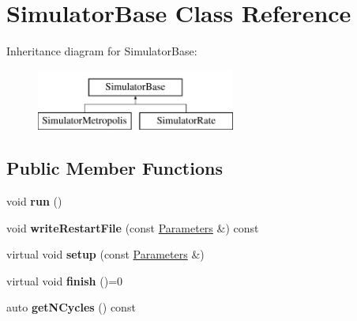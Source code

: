 \hypertarget{classSimulatorBase}{}\section{Simulator\+Base Class Reference}
\label{classSimulatorBase}
Inheritance diagram for Simulator\+Base\+:\begin{figure}[H]
\begin{center}
\leavevmode
\includegraphics[height=2.000000cm]{classSimulatorBase}
\end{center}
\end{figure}
\subsection*{Public Member Functions}
\begin{DoxyCompactItemize}
\item 
\mbox{\label{classSimulatorBase_a5f4de392eb878221ee6659e0ba74f872}} 
void {\bfseries run} ()
\item 
\mbox{\label{classSimulatorBase_abf93602f7d449518be2bdbe1587a660e}} 
void {\bfseries write\+Restart\+File} (const \mbox{\hyperlink{classParameters}{Parameters}} \&) const
\item 
\mbox{\label{classSimulatorBase_ab62968759e46cac079187d96b4e581a1}} 
virtual void {\bfseries setup} (const \mbox{\hyperlink{classParameters}{Parameters}} \&)
\item 
\mbox{\label{classSimulatorBase_a0fec722db46abb94bbf9446fd4064f89}} 
virtual void {\bfseries finish} ()=0
\item 
\mbox{\label{classSimulatorBase_a7d89155f2b293deebd6eaf79ba1bb76d}} 
auto {\bfseries get\+N\+Cycles} () const
\end{DoxyCompactItemize}
